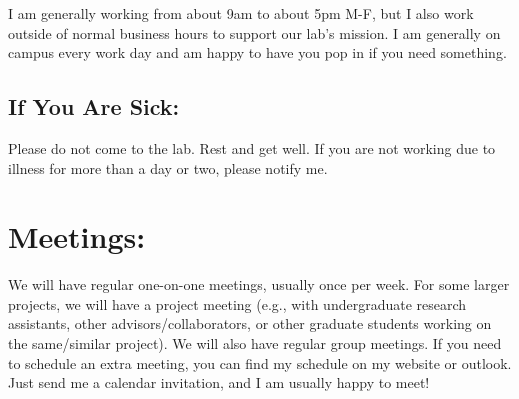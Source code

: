 \documentclass[11pt,letterpaper]{article}
\begin{document}
I am generally working from about 9am to about 5pm M-F, but I also work outside of normal business hours to support our lab's mission. I am generally on campus every work day and am happy to have you pop in if you need something.


\subsection{If You Are Sick:} Please do not come to the lab. Rest and get well. If you are not working due to illness for more than a day or two, please notify me.

\section{Meetings:} We will have regular one-on-one meetings, usually once per week. For some larger projects, we will have a project meeting (e.g., with undergraduate research assistants, other advisors/collaborators, or other graduate students working on the same/similar project). We will also have regular group meetings. If you need to schedule an extra meeting, you can find my schedule on my website or outlook. Just send me a calendar invitation, and I am usually happy to meet!
\end{document}
